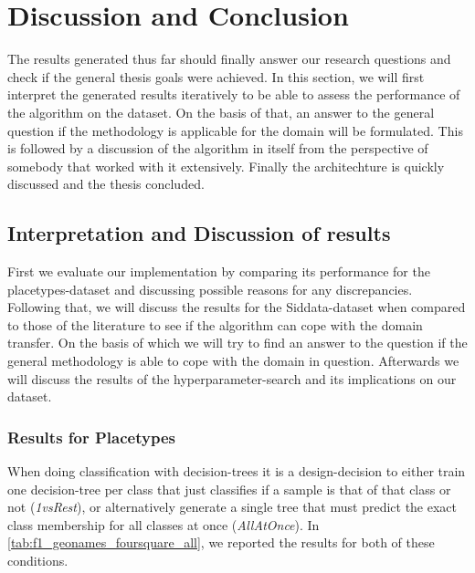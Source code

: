 \chapter{Discussion and Conclusion}

The results generated thus far should finally answer our research questions and check if the general thesis goals were achieved. In this section, we will first interpret the generated results iteratively to be able to assess the performance of the algorithm on the dataset. On the basis of that, an answer to the general question if the methodology is applicable for the domain will be formulated. This is followed by a discussion of the algorithm in itself from the perspective of somebody that worked with it extensively. Finally the architechture is quickly discussed and the thesis concluded.

\section{Interpretation and Discussion of results}

First we evaluate our implementation by comparing its performance for the placetypes-dataset and discussing possible reasons for any discrepancies. Following that, we will discuss the results for the Siddata-dataset when compared to those of the literature to see if the algorithm can cope with the domain transfer. On the basis of which we will try to find an answer to the question if the general methodology is able to cope with the domain in question. Afterwards we will discuss the results of the hyperparameter-search and its implications on our dataset.

\subsection{Results for Placetypes}

When doing classification with decision-trees it is a design-decision to either train one decision-tree per class that just classifies if a sample is that of that class or not (\textit{1vsRest}), or alternatively generate a single tree that must predict the exact class membership for all classes at once (\textit{AllAtOnce}). In \autoref{tab:f1_geonames_foursquare_all}, we reported the results for both of these conditions. 

